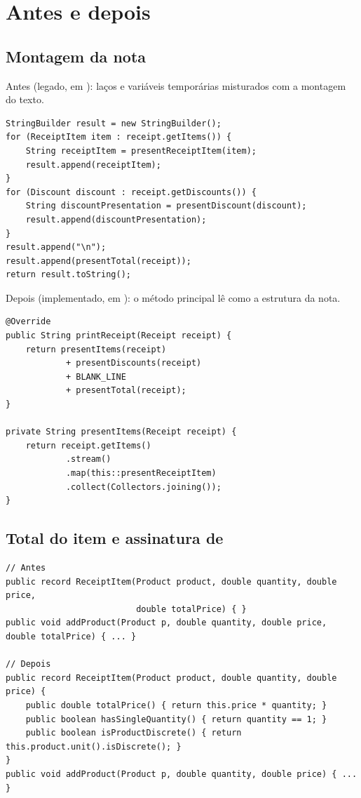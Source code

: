 \section{Antes e depois}
\subsection{Montagem da nota}
Antes (legado, em ): la\c{c}os e vari\'aveis tempor\'arias misturados com a montagem do texto.
\begin{lstlisting}
StringBuilder result = new StringBuilder();
for (ReceiptItem item : receipt.getItems()) {
    String receiptItem = presentReceiptItem(item);
    result.append(receiptItem);
}
for (Discount discount : receipt.getDiscounts()) {
    String discountPresentation = presentDiscount(discount);
    result.append(discountPresentation);
}
result.append("\n");
result.append(presentTotal(receipt));
return result.toString();
\end{lstlisting}
Depois (implementado, em ): o m\'etodo principal l\^e como a estrutura da nota.
\begin{lstlisting}
@Override
public String printReceipt(Receipt receipt) {
    return presentItems(receipt)
            + presentDiscounts(receipt)
            + BLANK_LINE
            + presentTotal(receipt);
}

private String presentItems(Receipt receipt) {
    return receipt.getItems()
            .stream()
            .map(this::presentReceiptItem)
            .collect(Collectors.joining());
}
\end{lstlisting}

\subsection{Total do item e assinatura de }
\begin{lstlisting}
// Antes
public record ReceiptItem(Product product, double quantity, double price,
                          double totalPrice) { }
public void addProduct(Product p, double quantity, double price, double totalPrice) { ... }

// Depois
public record ReceiptItem(Product product, double quantity, double price) {
    public double totalPrice() { return this.price * quantity; }
    public boolean hasSingleQuantity() { return quantity == 1; }
    public boolean isProductDiscrete() { return this.product.unit().isDiscrete(); }
}
public void addProduct(Product p, double quantity, double price) { ... }
\end{lstlisting}


